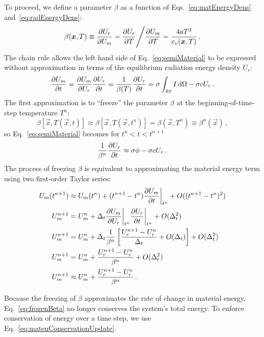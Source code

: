To proceed, we define a parameter $\beta$ as a function of
Eqs.~\eqref{eq:matEnergyDens} and~\eqref{eq:radEnergyDens}:
\begin{equation} \label{eq:beta}
  \beta(\bm{x}, T) \equiv \frac{\partial U_r}{\partial U_m} 
  = \frac{\partial U_r}{\partial T} \Bigg/ \frac{\partial U_m}{\partial T}
  = \frac{4 a T^3}{c_v(\bm{x}, T)} \,.
\end{equation}
The chain rule allows the left hand side of Eq.~\eqref{eq:semiMaterial} to be
expressed without approximation in terms of the equilibrium radiation energy
density $U_r$:
\begin{equation*}
  \frac{\partial U_m}{\partial t} = \frac{\partial U_m}{\partial U_r} \frac{\partial U_r}{\partial t} = \frac{1}{\beta(T)}
  \frac{\partial U_r}{\partial t} = \sigma \int_{4\pi}  I \mathop{}\!\mathrm{d} \Omega - \sigma c U_r \,.
\end{equation*}
The first approximation is to ``freeze'' the parameter $\beta$ at the
beginning-of-time-step temperature $T^n$:
\begin{equation*}
  \beta[\vec{x},T(\vec{x},t)] \approx \beta[\vec{x},T(\vec{x},t^n)]
  = \beta(\vec{x}, T^n) \equiv \beta^n(\vec{x})\,,
\end{equation*}
so Eq.~\eqref{eq:semiMaterial} becomes for $t^n < t < t^{n+1}$
\begin{equation}\label{eq:frozenBeta}
  \frac{1}{\beta^n}
  \frac{\partial U_r}{\partial t} \approx \sigma \phi - \sigma c U_r \,.
\end{equation}
The process of freezing $\beta$ is equivalent to approximating the
material energy term using two first-order Taylor series:
\begin{align} \nonumber
  U_m(t^{n+1})
  &\approx U_m(t^n) + (t^{n+1} - t^n) \frac{\partial U_m}{\partial t}\bigg|_{t^n} + O( (t^{n+1} - t^n)^2)
  \\ \nonumber
  U_m^{n+1}
  &= U_m^n + \Delta_t \frac{\partial U_m}{\partial U_r}\bigg|_{t^n} \frac{\partial U_r}{\partial t}\bigg|_{t^n}
  + O( \Delta_t^2 )
  \\ \nonumber
   U_m^{n+1}
   &= U_m^n + \Delta_t \frac{1}{\beta^n} \left[ \frac{U_r^{n+1} - U_r^n}{\Delta_t} +
  O(\Delta_t) \right]
  + O( \Delta_t^2 )
  \\ \nonumber
   U_m^{n+1}
  &= U_m^n + \frac{U_r^{n+1} - U_r^n}{\beta^n} + O( \Delta_t^2 )
  \\
  \label{eq:matenConservationUpdate}
  U_m^{n+1}
  &\approx U_m^n + \frac{U_r^{n+1} - U_r^n}{\beta^n} \,.
\end{align}

Because the freezing of $\beta$ approximates the rate of change
in material energy, Eq.~\eqref{eq:frozenBeta} no longer conserves the system's
total energy. To enforce conservation of energy over a time step, we use
Eq.~\eqref{eq:matenConservationUpdate}.

